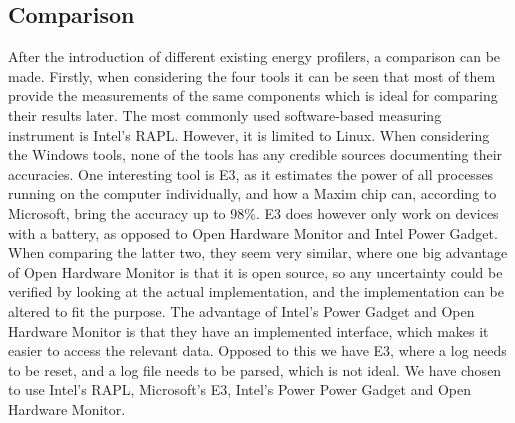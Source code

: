 \subsection{Comparison}\label{subsec:software_comparison}

After the introduction of different existing energy profilers, a comparison can be made. Firstly, when considering the four tools it can be seen that most of them provide the measurements of the same components which is ideal for comparing their results later. The most commonly used software-based measuring instrument is Intel's RAPL. However, it is limited to Linux. When considering the Windows tools, none of the tools has any credible sources documenting their accuracies. One interesting tool is E3, as it estimates the power of all processes running on the computer individually, and how a Maxim chip can, according to Microsoft, bring the accuracy up to 98\%.\cite[]{E3WinHec} E3 does however only work on devices with a battery, as opposed to Open Hardware Monitor and Intel Power Gadget. When comparing the latter two, they seem very similar, where one big advantage of Open Hardware Monitor is that it is open source, so any uncertainty could be verified by looking at the actual implementation, and the implementation can be altered to fit the purpose. The advantage of Intel's Power Gadget and Open Hardware Monitor is that they have an implemented interface, which makes it easier to access the relevant data. Opposed to this we have E3, where a log needs to be reset, and a log file needs to be parsed, which is not ideal. We have chosen to use Intel's RAPL, Microsoft's E3, Intel's Power Power Gadget and Open Hardware Monitor. 


